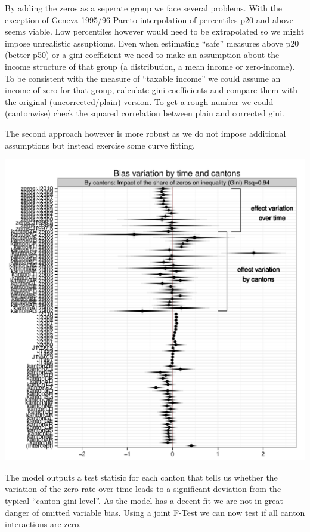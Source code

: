 \documentclass[twoside]{article}\usepackage[]{graphicx}\usepackage[]{color}
\makeatletter
\def\maxwidth{ %
  \ifdim\Gin@nat@width>\linewidth
    \linewidth
  \else
    \Gin@nat@width
  \fi
}
\newenvironment{knitrout}{}{} %
\makeatother
\begin{document}
\begin{multicols}{2}
By adding the zeros as a seperate group we face several problems. With the exception of Geneva 1995/96 Pareto interpolation of percentiles p20 and above seems viable. Low percentiles however would need to be extrapolated so we might impose unrealistic assuptioms. Even when estimating ``safe'' measures above p20 (better p50) or a gini coefficient we need to make an assumption about the income structure of that group (a distribution, a mean income or zero-income). To be consistent with the measure of ``taxable income'' we could assume an income of zero for that group, calculate gini coefficients and compare them with the original (uncorrected/plain) version. To get a rough number we could (cantonwise) check the squared correlation between plain and corrected gini.

The second approach however is more robust as we do not impose additional assumptions but instead exercise some curve fitting.

\begin{knitrout}
\color{fgcolor}
\includegraphics[width=\maxwidth]{figure/corrected_gini} 

\end{knitrout}


The model outputs a test statisic for each canton that tells us whether the variation of the zero-rate over time leads to a significant deviation from the typical ``canton gini-level''. As the model has a decent fit we are not in great danger of omitted variable bias. Using a joint F-Test we can now test if all canton interactions are zero. 





\end{multicols}
\end{document}
